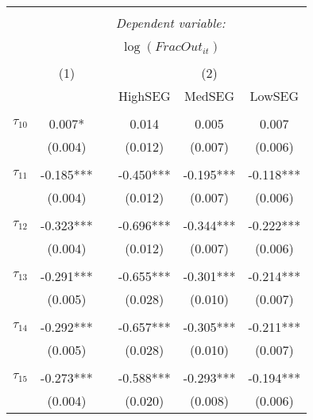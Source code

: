 \begin{tabular}{@{\extracolsep{-5pt}}lccccc} 
\\[-1.8ex]\hline 
\hline \\[-1.8ex] 
 & \multicolumn{5}{c}{\textit{Dependent variable:}} \\ 
\cline{2-6} 
\\[-1.8ex] & \multicolumn{5}{c}{$\log(FracOut_{it})$}\\ 
\\[-1.8ex] & (1) && \multicolumn{3}{c}{(2)} \\ 
\cline{2-2}\cline{4-6}
        &&& HighSEG & MedSEG & LowSEG  \\
 \\[-1.8ex] 
$\tau_{10}$     &  0.007*   &&   0.014   &   0.005   &   0.007   \\
                &  (0.004)  &&  (0.012)  &  (0.007)  &  (0.006)  \\
                &           &&           &           &           \\[-2.1ex]
$\tau_{11}$     & -0.185*** && -0.450*** & -0.195*** & -0.118*** \\
                &  (0.004)  &&  (0.012)  &  (0.007)  &  (0.006)  \\
                &           &&           &           &           \\[-2.1ex]
$\tau_{12}$     & -0.323*** && -0.696*** & -0.344*** & -0.222*** \\
                &  (0.004)  &&  (0.012)  &  (0.007)  &  (0.006)  \\
                &           &&           &           &           \\[-2.1ex]
$\tau_{13}$     & -0.291*** && -0.655*** & -0.301*** & -0.214*** \\
                &  (0.005)  &&  (0.028)  &  (0.010)  &  (0.007)  \\
                &           &&           &           &           \\[-2.1ex]
$\tau_{14}$     & -0.292*** && -0.657*** & -0.305*** & -0.211*** \\
                &  (0.005)  &&  (0.028)  &  (0.010)  &  (0.007)  \\
                &           &&           &           &           \\[-2.1ex]
$\tau_{15}$     & -0.273*** && -0.588*** & -0.293*** & -0.194*** \\
                &  (0.004)  &&  (0.020)  &  (0.008)  &  (0.006)  \\

\end{tabular}
